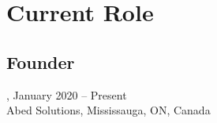 \section{Current Role}
\subsection{Founder}, January 2020 -- Present\\
Abed Solutions, Mississauga, ON, Canada

